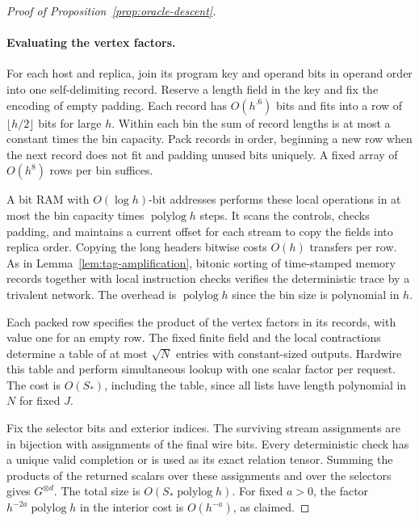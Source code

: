 \begin{proof}[Proof of Proposition~\ref{prop:oracle-descent}]
\paragraph{Evaluating the vertex factors.}
For each host and replica, join its program key and operand bits in
operand order into one self-delimiting record. Reserve a length field
in the key and fix the encoding of empty padding. Each record has
$O(h^{.6})$ bits and fits into a row of $\lfloor h/2\rfloor$ bits for
large $h$. Within each bin the sum of record lengths is at most a
constant times the bin capacity. Pack records in order, beginning a
new row when the next record does not fit and padding unused bits
uniquely. A fixed array of $O(h^8)$ rows per bin suffices.

A bit RAM with $O(\log h)$-bit addresses performs these local operations
in at most the bin capacity times $\operatorname{polylog} h$ steps.
It scans the controls, checks padding, and maintains a current offset
for each stream to copy the fields into replica order. Copying the
long headers bitwise costs $O(h)$ transfers per row. As in
Lemma~\ref{lem:tag-amplification}, bitonic sorting of time-stamped
memory records together with local instruction checks verifies the
deterministic trace by a trivalent network. The overhead is
$\operatorname{polylog} h$ since the bin size is polynomial in $h$.

Each packed row specifies the product of the vertex factors in its
records, with value one for an empty row. The fixed finite field and
the local contractions determine a table of at most $\sqrt N$ entries
with constant-sized outputs. Hardwire this table and perform
simultaneous lookup with one scalar factor per request. The cost
is $O(S_*)$, including the table, since all lists have length
polynomial in $N$ for fixed $J$.

Fix the selector bits and exterior indices. The surviving stream
assignments are in bijection with assignments of the final wire bits.
Every deterministic check has a unique valid completion or is used
as its exact relation tensor. Summing the products of the returned
scalars over these assignments and over the selectors gives
$G^{\otimes d}$. The total size is $O(S_*\operatorname{polylog} h)$.
For fixed $a>0$, the factor $h^{-2a}\operatorname{polylog} h$ in the
interior cost is $O(h^{-a})$, as claimed.
\end{proof}
